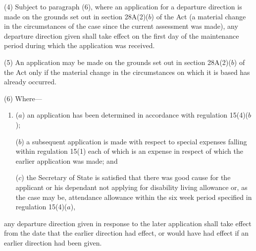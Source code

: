 \documentclass[12pt,a4paper]{article}
\begin{document}
(4) Subject to paragraph (6), where an application for a departure direction is
made on the grounds set out in section 28A(2)($b$) of the Act (a material change
in the circumstances of the case since the current assessment was made), any
departure direction given shall take effect on the first day of the maintenance
period during which the application was received.

(5) An application may be made on the grounds set out in section 28A(2)($b$) of
the Act only if the material change in the circumstances on which it is based
has already occurred.

(6) Where—
\begin{enumerate}\item[]
($a$) an application has been determined in accordance with regulation 15(4)($b$);

($b$) a subsequent application is made with respect to special expenses falling
within regulation 15(1) each of which is an expense in respect of which the
earlier application was made; and

($c$) the Secretary of State is satisfied that there was good cause for the
applicant or his dependant not applying for disability living allowance or, as
the case may be, attendance allowance within the six week period specified in
regulation 15(4)($a$),
\end{enumerate}
any departure direction given in response to the later application shall take
effect from the date that the earlier direction had effect, or would have had
effect if an earlier direction had been given.

%
\end{document}
